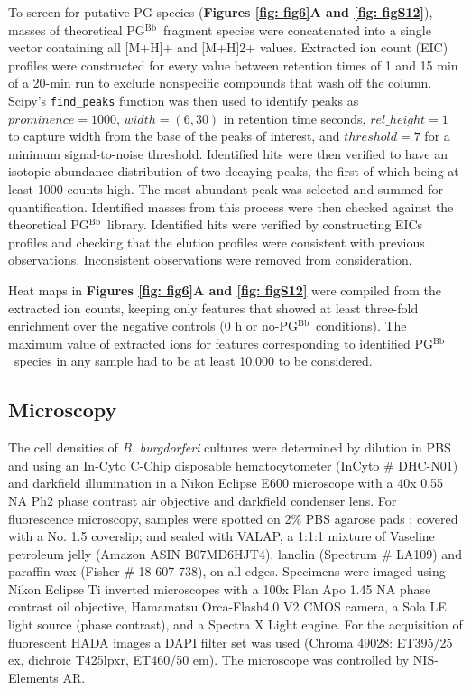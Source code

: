 \documentclass[twoside, watermark]{zHenriquesLab-StyleBioRxiv}
\newcommand{\pgbb}{PG$^\text{Bb}$}
\begin{document}
\vspace{1mm}
To screen for putative PG species (\textbf{Figures \ref{fig: fig6}A and \ref{fig: figS12}}), masses of theoretical \pgbb~fragment species were concatenated into a single vector containing all [M+H]+ and [M+H]2+ values. Extracted ion count (EIC) profiles were constructed for every value between retention times of 1 and 15 min of a 20-min run to exclude nonspecific compounds that wash off the column. Scipy’s \texttt{find\_peaks} function was then used to identify peaks as $prominence=1000$, $width=(6,30)$ in retention time seconds, $rel\_height=1$ to capture width from the base of the peaks of interest, and $threshold=7$ for a minimum signal-to-noise threshold. Identified hits were then verified to have an isotopic abundance distribution of two decaying peaks, the first of which being at least 1000 counts high. The most abundant peak was selected and summed for quantification. Identified masses from this process were then checked against the theoretical \pgbb~library. Identified hits were verified by constructing EICs profiles and checking that the elution profiles were consistent with previous observations. Inconsistent observations were removed from consideration.

\vspace{1mm}
Heat maps in \textbf{Figures \ref{fig: fig6}A and \ref{fig: figS12}} were compiled from the extracted ion counts, keeping only features that showed at least three-fold enrichment over the negative controls (0 h or no-\pgbb~conditions). The maximum value of extracted ions for features corresponding to identified \pgbb~species in any sample had to be at least 10,000 to be considered.

\subsection*{Microscopy}
The cell densities of \textit{B. burgdorferi} cultures were determined by dilution in PBS and using an In-Cyto C-Chip disposable hematocytometer (InCyto \# DHC-N01) and darkfield illumination in a Nikon Eclipse E600 microscope with a 40x 0.55 NA Ph2 phase contrast air objective and darkfield condenser lens. For fluorescence microscopy, samples were spotted on 2\% PBS agarose pads \cite{Glaser1997,Jutras2016}; covered with a No. 1.5 coverslip; and sealed with VALAP, a 1:1:1 mixture of Vaseline petroleum jelly (Amazon ASIN B07MD6HJT4), lanolin (Spectrum \# LA109) and paraffin wax (Fisher \# 18-607-738), on all edges. Specimens were imaged using Nikon Eclipse Ti inverted microscopes with a 100x Plan Apo 1.45 NA phase contrast oil objective, Hamamatsu Orca-Flash4.0 V2 CMOS camera, a Sola LE light source (phase contrast), and a Spectra X Light engine. For the acquisition of fluorescent HADA images a DAPI filter set was used (Chroma 49028: ET395/25 ex, dichroic T425lpxr, ET460/50 em). The microscope was controlled by NIS-Elements AR. 
\end{document}
